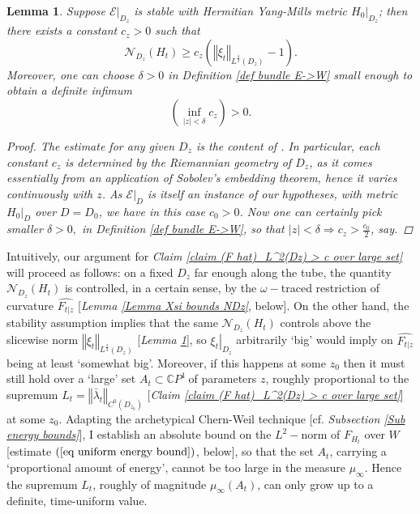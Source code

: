 \documentclass{article}
\newcommand{\mc}[1]{\mathcal{#1}}
\newtheorem{lemma}[theorem]{Lemma}
\begin{document}
\begin{lemma}   \label{Lemma NDz > xi_L^4/3}
        Suppose $\left.\mathcal{E}\right\vert_{D_z}$ is stable with Hermitian         Yang-Mills metric $\left.H_0\right\vert_{D_z}$; then there exists         a  constant $c_z>0$ such that 
        \begin{displaymath}
                \mathcal{N}_{D_{z}}\left( H_{t}\right)\geq c_z \left( \left\Vert\xi_t\right\Vert_{L^\frac{4}{3}(D_z)}-1                 \right).
        \end{displaymath}
        Moreover, one can choose $\delta>0$ in \emph{Definition \ref{def bundle E->W}} small enough to obtain a definite infimum $$
\left(\inf_{\left\vert z \right\vert<\delta}{c_{z}}\right)>0.
$$ 
\begin{proof}
The estimate for any given $D_z$ is the content of \cite[Lemma 24]{inf dets stab bdls...}. In particular, each constant $c_z$ is determined by the Riemannian geometry of $D_z$, as it comes essentially from an application of Sobolev's embedding theorem, hence it varies continuously with $z$. As $\left.\mc{E}\right\vert_{D}$ is itself an instance of our hypotheses, with metric $\left.H_0\right\vert_{D}$ over $D=D_0$, we have in this case $c_0>0$. Now one can certainly pick smaller $\delta>0,$ in \emph{Definition \ref{def bundle E->W}}, so that $\left\vert z\right\vert < \delta \Rightarrow c_z>\frac{c_0}{2}$, say.   
\end{proof}
\end{lemma}

 
Intuitively, our argument for \emph{Claim \ref{claim (F hat)_L^2(Dz) > c  over large set}} will proceed as follows: on a fixed $D_{z}$ far enough
along the tube, the quantity $\mathcal{N}_{D_{z}}\left( H_{t}\right) $ is controlled, in a certain sense, by the $\omega-$traced restriction of curvature   $\widehat{F_{t\vert z}}$ [\emph{Lemma \ref{Lemma Xsi bounds NDz}}, below]. On the other hand, the stability assumption implies that the same $\mathcal{N}_{D_{z}}\left(
H_{t}\right) $  controls above the slicewise norm  $\left\Vert \xi _{t}\right\Vert _{L^{\frac{4}{3}}(D_z)}$ [\emph{Lemma \ref{Lemma NDz > xi_L^4/3}}], so $\left.\xi _{t}\right\vert_{D_z}$ arbitrarily `big' would imply on $\widehat{F_{t\vert z}}$ being at least `somewhat big'. Moreover, if this happens at some $z_{0}$ then it must still hold over a `large' set $A_{t}\subset\mathbb{C}P^{1}\ $of parameters $z$, roughly proportional to the supremum $L_{t}=\left\Vert \bar\lambda_{t}\right\Vert _{C^{0}\left( D_{z_{0}}\right) }$ [\emph{Claim \ref{claim (F hat)_L^2(Dz) > c  over large set}}] at some $z_0$. 
Adapting the archetypical Chern-Weil technique [cf. \emph{Subsection \ref{Sub energy bounds}}], I  establish an absolute bound on the $L^2-$norm of $F_{H_{t}}$ over $W$ [estimate $\left( \ref{eq uniform energy bound} \right)$, below], so that the set $A_{t}$, carrying a `proportional amount of energy', cannot be too large in the measure $\mu_{\infty}$. Hence the supremum $L_t$, roughly of magnitude $\mu_{\infty}(A_t)$, can only grow up to a definite, time-uniform value. 
\end{document}
